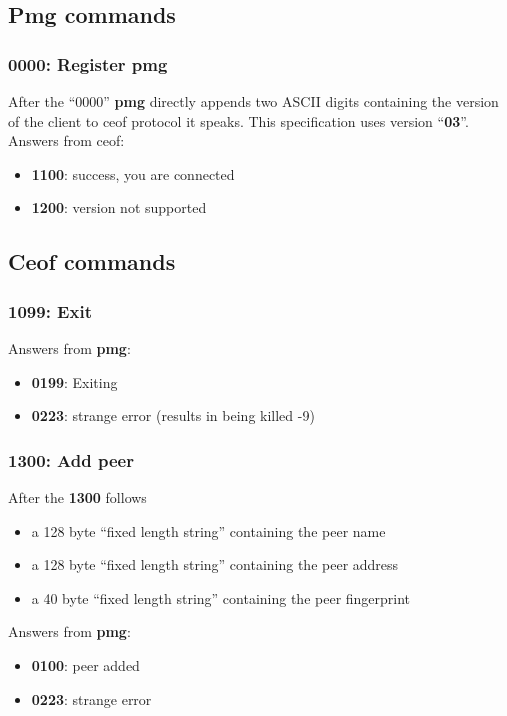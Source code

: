 \documentclass[12pt,a4paper]{book}
\begin{document}
\subsection{Pmg commands}
\subsubsection{0000: Register pmg}
After the "`0000"' \textbf{pmg} directly appends two ASCII digits containing the
version of the client to ceof protocol it speaks. This specification
uses version "`\textbf{03}"'.
Answers from ceof:
\begin{itemize}
\item \textbf{1100}: success, you are connected
\item \textbf{1200}: version not supported
\end{itemize}
\subsection{Ceof commands}
\subsubsection{1099: Exit}
Answers from \textbf{pmg}:
\begin{itemize}
\item \textbf{0199}: Exiting
\item \textbf{0223}: strange error (results in being killed -9)
\end{itemize}
\subsubsection{1300: Add peer}
After the \textbf{1300} follows
\begin{itemize}
\item a 128 byte "`fixed length string"' containing the peer name
\item a 128 byte "`fixed length string"' containing the peer address
\item a 40 byte  "`fixed length string"' containing the peer fingerprint
\end{itemize}
Answers from \textbf{pmg}:
\begin{itemize}
\item \textbf{0100}: peer added
\item \textbf{0223}: strange error
\end{itemize}
\end{document}
